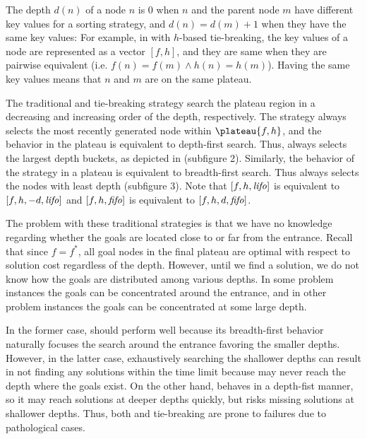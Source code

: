 The depth $d(n)$ of a
node $n$ is 0 when $n$ and the parent node $m$ have different key
values for a sorting strategy, and $d(n)=d(m)+1$ when they have the same
key values: For example, in \astar with $h$-based tie-breaking, the key
values of a node are represented as a vector $[f,h]$, and they are same
when they are pairwise equivalent (i.e. $f(n) = f(m) \land h(n) =
h(m)$).  Having the same key values means that $n$ and $m$ are on the
same plateau.

The traditional \lifo and \fifo tie-breaking strategy 
search the plateau region in a decreasing and increasing order of the depth, respectively.
The \lifo strategy always selects the most recently generated node
within $\plateau{f,h}$, and the behavior in the plateau is equivalent to depth-first search.
Thus, \lifo always selects the largest depth
buckets, as depicted in  (subfigure 2).
Similarly, the behavior of the \fifo strategy 
in a plateau is equivalent to breadth-first search. Thus \fifo 
always selects the nodes with least depth (subfigure 3).
Note that  $[f,h,{\text{\textit{lifo}}}]$ is equivalent to $[f,h,-d,{\text{\textit{lifo}}}]$ and
$[f,h,{\text{\textit{fifo}}}]$ is equivalent to $[f,h,d,{\text{\textit{fifo}}}]$.

The problem with these traditional strategies is that we have no knowledge
regarding whether the goals are located close to or far from the entrance. Recall
that since $f=f^*$, all goal nodes in the final plateau are optimal with respect to solution cost
regardless of the depth.
However, until we find a
solution, we do not know how the goals are distributed among various
depths. In some problem instances the goals can be concentrated around
the entrance, and in other problem instances the goals can be
concentrated at some large depth. %

In the former case, \fifo
should perform well because its breadth-first behavior naturally
focuses the search around the entrance favoring the smaller depths.
However, in the latter case, exhaustively searching
the shallower depths can result in not finding any solutions within
the time limit because \fifo may never reach the depth where the goals
exist.  On the other hand, \lifo behaves in a depth-fist manner, so it
may reach solutions at deeper depths quickly, but risks missing
solutions at shallower depths.  Thus, both \fifo and \lifo tie-breaking
are prone to failures due to pathological cases.

